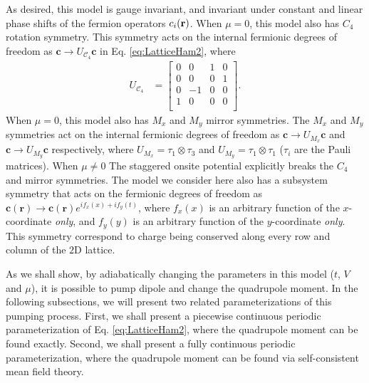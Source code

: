 \documentclass[prb,aps,twocolumn,groupaddress,floatfix]{revtex4-1}
\begin{document}
As desired, this model is gauge invariant, and invariant under constant and linear phase shifts of the fermion operators $c_i({\bf{r}})$. When $\mu = 0$, this model also has $C_4$ rotation symmetry. This symmetry acts on the internal fermionic degrees of freedom as $\bm{c} \rightarrow U_{\mathcal{C}_4}  \bm{c}$ in Eq. \ref{eq:LatticeHam2}, where 
\begin{equation}
\begin{split}
U_{\mathcal{C}_4} & = \begin{bmatrix}
0 & 0 & 1 & 0\\
0 & 0 & 0 & 1\\
0 & -1 & 0 & 0\\
1 & 0 & 0 & 0\\
\end{bmatrix}.\label{eq:C4SymDef}
\end{split}
\end{equation}
 When $\mu = 0$, this model also has $M_x$ and $M_y$ mirror symmetries. The $M_x$ and $M_y$ symmetries act on the internal fermionic degrees of freedom as $\bm{c} \rightarrow U_{M_x}  \bm{c}$ and $\bm{c} \rightarrow U_{M_y}  \bm{c}$ respectively, where $U_{M_x} = \tau_1 \otimes \tau_3$ and $U_{M_y} = \tau_1 \otimes \tau_1$ ($\tau_i$ are the Pauli matrices). When $\mu\neq 0$ The staggered onsite potential explicitly breaks the $C_4$ and mirror symmetries. The model we consider here also has a subsystem symmetry that acts on the fermionic degrees of freedom as $\bm{c}(\bm{r})\rightarrow \bm{c}(\bm{r})e^{i f_x(x)+i f_y(t)}$, where $f_x(x)$ is an arbitrary function of the $x$-coordinate \textit{only}, and $f_y(y)$ is an arbitrary function of the $y$-coordinate \textit{only}. This symmetry correspond to charge being conserved along every row and column of the $2$D lattice.


As we shall show, by adiabatically changing the parameters in this model ($t$, $V$ and $\mu$), it is possible to pump dipole and change the quadrupole moment. In the following subsections, we will present two related parameterizations of this pumping process. First, we shall present a piecewise continuous periodic parameterization of Eq. \ref{eq:LatticeHam2}, where the quadrupole moment can be found exactly. Second, we shall present a fully continuous periodic parameterization, where the quadrupole moment can be found via self-consistent mean field theory. 
\end{document}
